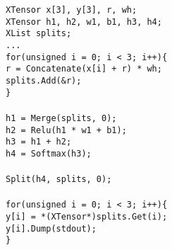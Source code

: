  \begin{tcolorbox}
[bicolor,sidebyside,width=11cm,righthand width=4cm,size=title,frame engine=empty,
 colback=blue!10!white,colbacklower=black!5!white]
 {\scriptsize
\begin{tabbing}
\texttt{XTensor x[3], y[3], r, wh;} \\
\texttt{XTensor h1, h2, w1, b1, h3, h4;} \\
\texttt{XList splits;} \\
\texttt{...} \\
\texttt{for(unsigned i = 0; i < 3; i++)\{} \\
\texttt{\hspace{2em}r = Concatenate(x[i] + r) * wh;}\\
\texttt{\hspace{2em}splits.Add(\&r);}\\
\texttt{\}}\\

\texttt{} \\
\texttt{h1 = Merge(splits, 0);}\\
\texttt{h2 = Relu(h1 * w1 + b1);}\\
\texttt{h3 = h1 + h2;} \\
\texttt{h4 = Softmax(h3);} \\


\texttt{} \\
\texttt{Split(h4, splits, 0);} \\
\texttt{} \\
\texttt{for(unsigned i = 0; i < 3; i++)\{} \\
\texttt{\hspace{2em}y[i] = *(XTensor*)splits.Get(i);}\\
\texttt{\hspace{2em}y[i].Dump(stdout);}\\
\texttt{\}}


\end{tabbing}}
\end{tcolorbox}
